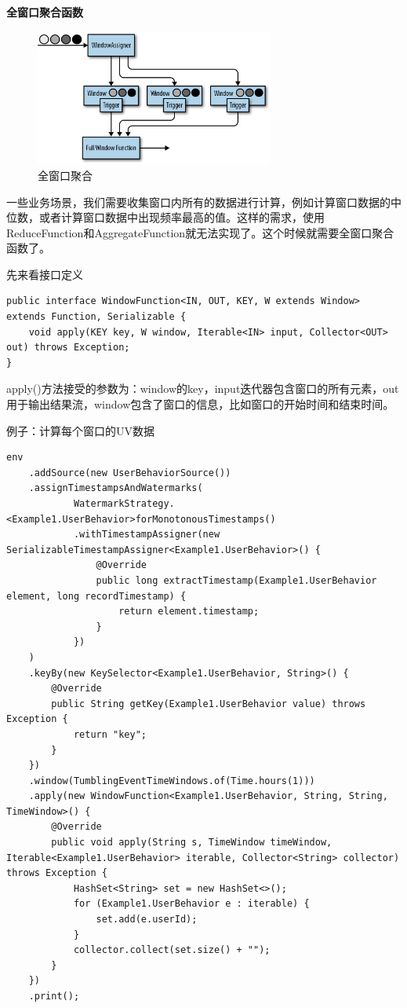 \documentclass[cn,11pt,chinese]{elegantbook}
\begin{document}
\textbf{全窗口聚合函数}

\begin{figure}[htbp]
    \centering
    \includegraphics[width=0.7\textwidth]{images/spaf_0605.png}
    \caption{全窗口聚合}
\end{figure}

一些业务场景，我们需要收集窗口内所有的数据进行计算，例如计算窗口数据的中位数，或者计算窗口数据中出现频率最高的值。这样的需求，使用ReduceFunction和AggregateFunction就无法实现了。这个时候就需要全窗口聚合函数了。

先来看接口定义

\begin{verbatim}
public interface WindowFunction<IN, OUT, KEY, W extends Window> extends Function, Serializable {
    void apply(KEY key, W window, Iterable<IN> input, Collector<OUT> out) throws Exception;
}
\end{verbatim}

apply()方法接受的参数为：window的key，input迭代器包含窗口的所有元素，out用于输出结果流，window包含了窗口的信息，比如窗口的开始时间和结束时间。

例子：计算每个窗口的UV数据

\begin{verbatim}
env
    .addSource(new UserBehaviorSource())
    .assignTimestampsAndWatermarks(
            WatermarkStrategy.<Example1.UserBehavior>forMonotonousTimestamps()
            .withTimestampAssigner(new SerializableTimestampAssigner<Example1.UserBehavior>() {
                @Override
                public long extractTimestamp(Example1.UserBehavior element, long recordTimestamp) {
                    return element.timestamp;
                }
            })
    )
    .keyBy(new KeySelector<Example1.UserBehavior, String>() {
        @Override
        public String getKey(Example1.UserBehavior value) throws Exception {
            return "key";
        }
    })
    .window(TumblingEventTimeWindows.of(Time.hours(1)))
    .apply(new WindowFunction<Example1.UserBehavior, String, String, TimeWindow>() {
        @Override
        public void apply(String s, TimeWindow timeWindow, Iterable<Example1.UserBehavior> iterable, Collector<String> collector) throws Exception {
            HashSet<String> set = new HashSet<>();
            for (Example1.UserBehavior e : iterable) {
                set.add(e.userId);
            }
            collector.collect(set.size() + "");
        }
    })
    .print();
\end{verbatim}
\end{document}
